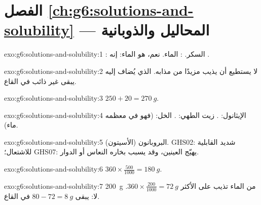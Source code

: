 \section*{الفصل \ref{ch:g6:solutions-and-solubility} --- المحاليل والذوبانية}

\begin{solution}{exo:g6:solutions-and-solubility:1}
: السكر. : الماء. نعم،  هو الماء: إنه .
\end{solution}

\begin{solution}{exo:g6:solutions-and-solubility:2}
 لا يستطيع أن يذيب مزيدًا من مذابه.  الذي يُضاف إليه يبقى
غير ذائب في القاع.
\end{solution}

\begin{solution}{exo:g6:solutions-and-solubility:3}
$250 + 20 = \qty{270}{g}$.
\end{solution}

\begin{solution}{exo:g6:solutions-and-solubility:4}
الإيثانول: . زيت الطهي: . الخل:  (فهو في معظمه ماء).
\end{solution}

\begin{solution}{exo:g6:solutions-and-solubility:5}
البروبانون (الأسيتون). GHS02: شديد القابلية للاشتعال؛ GHS07: يهيّج العينين،
وقد يسبب بخاره النعاس أو الدوار.
\end{solution}

\begin{solution}{exo:g6:solutions-and-solubility:6}
$360 \times \frac{500}{1000} = \qty{180}{g}$.
\end{solution}

\begin{solution}{exo:g6:solutions-and-solubility:7}
\qty{200}{g} من الماء تذيب على الأكثر $360 \times \frac{200}{1000} =
\qty{72}{g}$. لا: يبقى $80 - 72 = \qty{8}{g}$ في القاع.
\end{solution}

